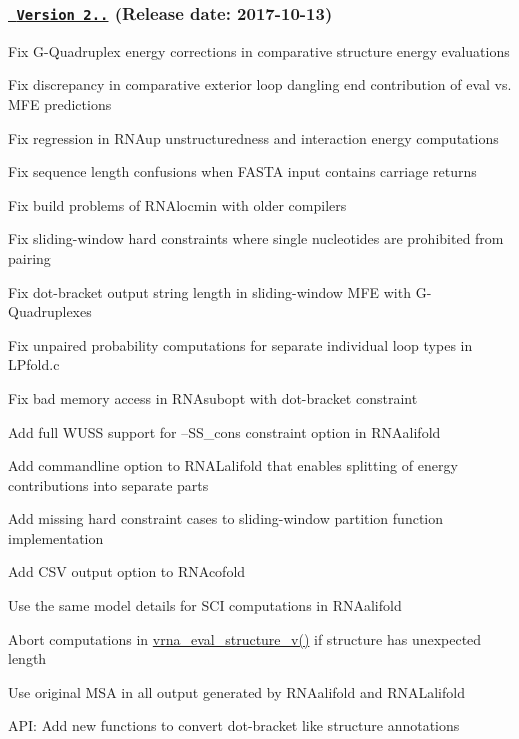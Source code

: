 \subsubsection*{\href{https://github.com/ViennaRNA/ViennaRNA/compare/v2.4.1...v2.4.2}{\texttt{ Version 2..}} (Release date\+: 2017-\/10-\/13)}


\begin{DoxyItemize}
\item Fix G-\/\+Quadruplex energy corrections in comparative structure energy evaluations
\item Fix discrepancy in comparative exterior loop dangling end contribution of eval vs. M\+FE predictions
\item Fix regression in R\+N\+Aup unstructuredness and interaction energy computations
\item Fix sequence length confusions when F\+A\+S\+TA input contains carriage returns
\item Fix build problems of R\+N\+Alocmin with older compilers
\item Fix sliding-\/window hard constraints where single nucleotides are prohibited from pairing
\item Fix dot-\/bracket output string length in sliding-\/window M\+FE with G-\/\+Quadruplexes
\item Fix unpaired probability computations for separate individual loop types in L\+Pfold.\+c
\item Fix bad memory access in R\+N\+Asubopt with dot-\/bracket constraint
\item Add full W\+U\+SS support for --S\+S\+\_\+cons constraint option in R\+N\+Aalifold
\item Add commandline option to R\+N\+A\+Lalifold that enables splitting of energy contributions into separate parts
\item Add missing hard constraint cases to sliding-\/window partition function implementation
\item Add C\+SV output option to R\+N\+Acofold
\item Use the same model details for S\+CI computations in R\+N\+Aalifold
\item Abort computations in \mbox{\hyperlink{group__eval_gab12e6b1226227670322150df018734f8}{vrna\+\_\+eval\+\_\+structure\+\_\+v()}} if structure has unexpected length
\item Use original M\+SA in all output generated by R\+N\+Aalifold and R\+N\+A\+Lalifold
\item A\+PI\+: Add new functions to convert dot-\/bracket like structure annotations

\end{DoxyItemize}

